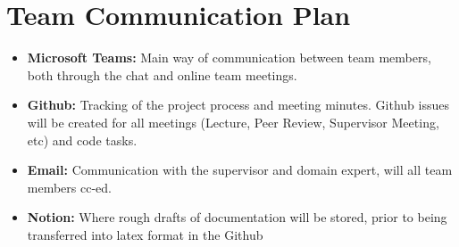 \documentclass{article}
\begin{document}
  \section{Team Communication Plan}
\begin{itemize}
  \item \textbf{Microsoft Teams:} Main way of communication between team members, both through the chat and online team meetings.
  \item \textbf{Github:} Tracking of the project process and meeting minutes. Github issues will be created for all meetings (Lecture, Peer Review, Supervisor Meeting, etc) and code tasks.
  \item \textbf{Email:} Communication with the supervisor and domain expert, will all team members cc-ed.
  \item \textbf{Notion:} Where rough drafts of documentation will be stored, prior to being transferred into latex format in the Github
\end{itemize}
\end{document}
